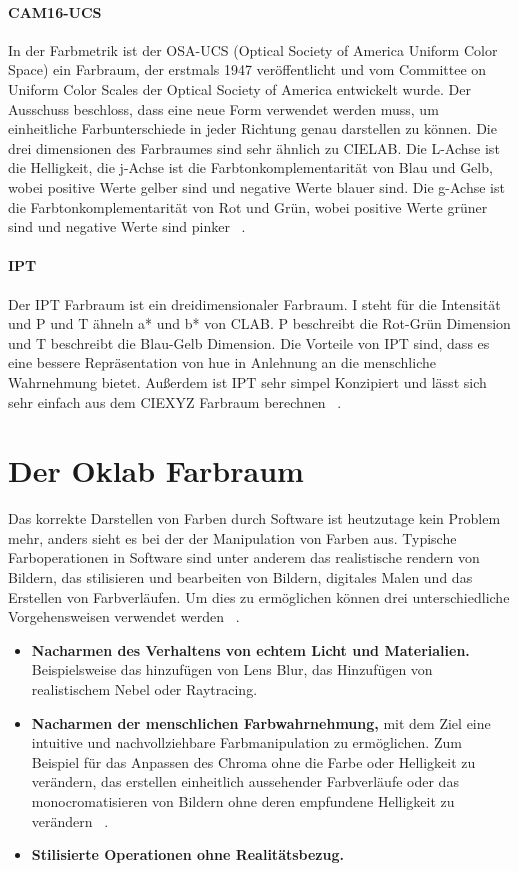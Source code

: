 \documentclass[12pt, a4paper, ngerman]{article}
\begin{document}
\paragraph{CAM16-UCS}
In der Farbmetrik ist der OSA-UCS (Optical Society of America Uniform Color Space) ein Farbraum, 
der erstmals 1947 veröffentlicht und vom Committee on Uniform Color Scales der Optical Society of America entwickelt wurde.
Der Ausschuss beschloss, dass eine neue Form verwendet werden muss, 
um einheitliche Farbunterschiede in jeder Richtung genau darstellen zu können.
Die drei dimensionen des Farbraumes sind sehr ähnlich zu CIELAB.
Die L-Achse ist die Helligkeit, die j-Achse ist die Farbtonkomplementarität von Blau und Gelb, 
wobei positive Werte gelber sind und negative Werte blauer sind.
Die g-Achse ist die Farbtonkomplementarität von Rot und Grün, 
wobei positive Werte grüner sind und negative Werte sind pinker ~\cite{OSA-UCS_2023}.

\paragraph{IPT}
Der IPT Farbraum ist ein dreidimensionaler Farbraum.
I steht für die Intensität und P und T ähneln a* und b* von CLAB. 
P beschreibt die Rot-Grün Dimension und T beschreibt die Blau-Gelb Dimension.
Die Vorteile von IPT sind, dass es eine bessere Repräsentation von hue 
in Anlehnung an die menschliche Wahrnehmung bietet. 
Außerdem ist IPT sehr simpel Konzipiert und lässt sich sehr einfach aus dem CIEXYZ Farbraum berechnen ~\cite{Ebner_1998}.

\section{Der Oklab Farbraum}
Das korrekte Darstellen von Farben durch Software ist heutzutage kein Problem mehr, 
anders sieht es bei der der Manipulation von Farben aus.
Typische Farboperationen in Software sind unter anderem das realistische rendern von Bildern, 
das stilisieren und bearbeiten von Bildern, digitales Malen und das Erstellen von Farbverläufen. 
Um dies zu ermöglichen können drei unterschiedliche Vorgehensweisen verwendet werden ~\cite{Ottosson_2020}.
\begin{itemize}
  \item \textbf{Nacharmen des Verhaltens von echtem Licht und Materialien.} Beispielsweise das hinzufügen von Lens Blur, das Hinzufügen von realistischem Nebel oder Raytracing.
  \item \textbf{Nacharmen der menschlichen Farbwahrnehmung,} mit dem Ziel eine intuitive und nachvollziehbare Farbmanipulation zu ermöglichen. Zum Beispiel für das Anpassen des Chroma ohne die Farbe oder Helligkeit zu verändern, das erstellen einheitlich aussehender Farbverläufe oder das monocromatisieren von Bildern ohne deren empfundene Helligkeit zu verändern ~\cite{Oklab_2020}.
  \item \textbf{Stilisierte Operationen ohne Realitätsbezug.} 
\end{itemize}
\end{document}
